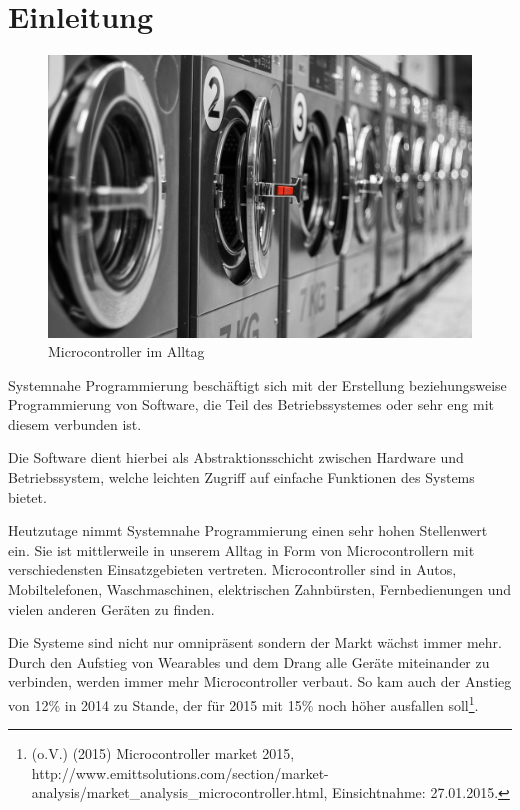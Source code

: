 
\chapter{Einleitung}\label{einleitung}

\begin{figure}[htbp]
\centering
\includegraphics{images/washing-maschine}
\caption[Microcontroller im Alltag]{Microcontroller im Alltag\footnotemark{}}
\end{figure}

Systemnahe Programmierung beschäftigt sich mit der Erstellung beziehungsweise Programmierung von
Software, die Teil des Betriebssystemes oder sehr eng mit diesem verbunden ist.

Die Software dient hierbei als Abstraktionsschicht zwischen Hardware und Betriebssystem, welche
leichten Zugriff auf einfache Funktionen des Systems bietet.

Heutzutage nimmt Systemnahe Programmierung einen sehr hohen Stellenwert ein. Sie ist mittlerweile in
unserem Alltag in Form von Microcontrollern mit verschiedensten Einsatzgebieten vertreten.
Microcontroller sind in Autos, Mobiltelefonen, Waschmaschinen, elektrischen Zahnbürsten,
Fernbedienungen und vielen anderen Geräten zu finden.

Die Systeme sind nicht nur omnipräsent sondern der Markt wächst immer mehr. Durch den Aufstieg von
Wearables und dem Drang alle Geräte miteinander zu verbinden, werden immer mehr Microcontroller
verbaut. So kam auch der Anstieg von 12\% in 2014 zu Stande, der für 2015 mit 15\% noch höher
ausfallen soll\footnote{(o.V.) (2015) Microcontroller market 2015,
  http://www.emittsolutions.com/section/market-analysis/market\_analysis\_microcontroller.html,
  Einsichtnahme: 27.01.2015.}.